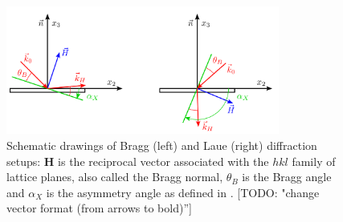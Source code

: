 \documentclass[preprint]{iucr}              %
\newcommand{\todo}[1]{{\color{red}[TODO: "#1'']}}
\begin{document}


\begin{figure}
    \centering
    \includegraphics[width=0.8\textwidth]{figures/edo_sketch.png}
    \caption{Schematic drawings of Bragg (left) and Laue (right) diffraction setups: \textbf{H} is the reciprocal vector associated with the $hkl$ family of lattice planes, also called the Bragg normal, $\theta_B$ is the Bragg angle and $\alpha_X$ is the asymmetry angle as defined in \cite{codeCRYSTAL}.
    \todo{change vector format (from arrows to bold)} }
    \label{fig:edo_sketch}
\end{figure}
\end{document}

